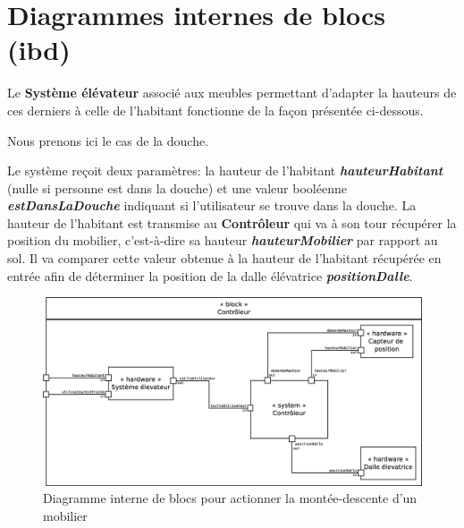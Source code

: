 \chapter{Diagrammes internes de blocs (ibd)}
Le \textbf{Système élévateur} associé aux meubles permettant d'adapter la hauteurs de ces derniers à celle de l'habitant fonctionne de la façon présentée ci-dessous.

Nous prenons ici le cas de la douche.

Le système reçoit deux paramètres: la hauteur de l'habitant \textbf{\textit{hauteurHabitant}} (nulle si personne est dans la douche) et une valeur booléenne \textbf{\textit{estDansLaDouche}} indiquant si l'utilisateur se trouve dans la douche. 
La hauteur de l'habitant est transmise au \textbf{Contrôleur} qui va à son tour récupérer la position du mobilier, c'est-à-dire sa hauteur \textbf{\textit{hauteurMobilier}} par rapport au sol. Il va comparer cette valeur obtenue à la hauteur de l'habitant récupérée en entrée afin de déterminer la position de la dalle élévatrice \textbf{\textit{positionDalle}}. 
\begin{figure}[H]
	\centering
	\includegraphics[width=1\linewidth]{diagrams/bathroom/diagramme_blocks_ibd.eps}
	\caption{Diagramme interne de blocs pour actionner la montée-descente d'un mobilier}
	\label{fig:diagramme_ibd}
\end{figure}

